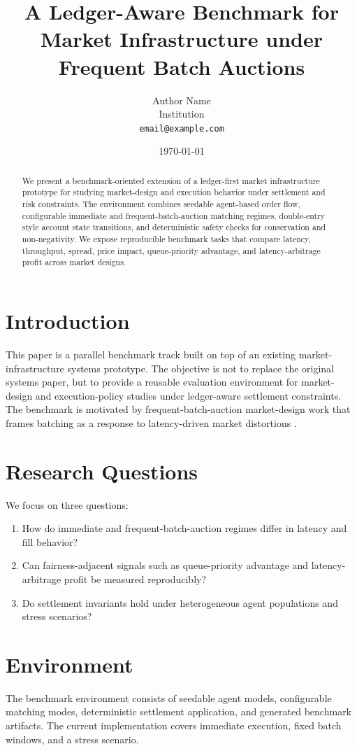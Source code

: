 \documentclass[11pt]{article}
\title{A Ledger-Aware Benchmark for Market Infrastructure under Frequent Batch Auctions}
\author{Author Name \\ Institution \\ \texttt{email@example.com}}
\date{\today}
\begin{document}
\maketitle

\begin{abstract}
We present a benchmark-oriented extension of a ledger-first market infrastructure prototype for studying market-design and execution behavior under settlement and risk constraints. The environment combines seedable agent-based order flow, configurable immediate and frequent-batch-auction matching regimes, double-entry style account state transitions, and deterministic safety checks for conservation and non-negativity. We expose reproducible benchmark tasks that compare latency, throughput, spread, price impact, queue-priority advantage, and latency-arbitrage profit across market designs.
\end{abstract}

\section{Introduction}
This paper is a parallel benchmark track built on top of an existing market-infrastructure systems prototype. The objective is not to replace the original systems paper, but to provide a reusable evaluation environment for market-design and execution-policy studies under ledger-aware settlement constraints. The benchmark is motivated by frequent-batch-auction market-design work that frames batching as a response to latency-driven market distortions \cite{budish2015fba}.

\section{Research Questions}
We focus on three questions:
\begin{enumerate}[leftmargin=*]
  \item How do immediate and frequent-batch-auction regimes differ in latency and fill behavior?
  \item Can fairness-adjacent signals such as queue-priority advantage and latency-arbitrage profit be measured reproducibly?
  \item Do settlement invariants hold under heterogeneous agent populations and stress scenarios?
\end{enumerate}

\section{Environment}
The benchmark environment consists of seedable agent models, configurable matching modes, deterministic settlement application, and generated benchmark artifacts. The current implementation covers immediate execution, fixed batch windows, and a stress scenario.
\end{document}
